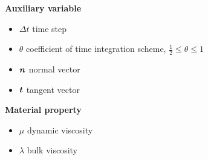 \documentclass[11pt]{article}
\def\bbf#1{\mathchoice{\hbox{\boldmath$\displaystyle#1$}}
{\hbox{\boldmath$\textstyle#1$}} {\hbox{\boldmath$\scriptstyle#1$}} {\hbox{\boldmath$\scriptscriptstyle#1$}} }
\newcommand{\n}{\bbf{n}}
\renewcommand{\t}{\bbf{t}}
\begin{document}
{\large \bf Auxiliary variable} %
\begin{itemize}
    \item $\Delta t$ time step
    \item $\theta$ coefficient of time integration scheme, $\frac{1}{2} \le \theta \le 1$
    \item $\n$ normal vector
    \item $\t$ tangent vector
\end{itemize}
{\large \bf Material property} %
\begin{itemize}
\item $\mu$ dynamic viscosity
\item $\lambda$ bulk viscosity
\end{itemize}
\end{document}
